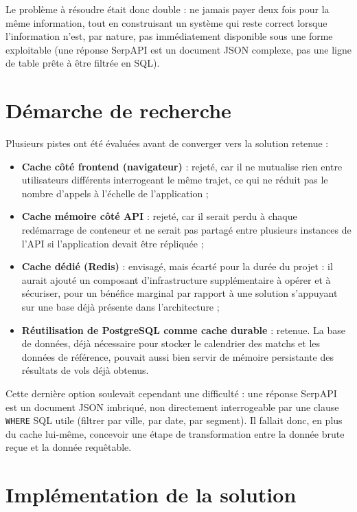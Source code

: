 \documentclass[11pt,a4paper]{report}
\newcommand{\code}[1]{\lstinline{#1}}
\begin{document}
Le problème à résoudre était donc double : ne jamais payer deux fois pour la même information, tout en construisant un système qui reste correct lorsque l'information n'est, par nature, pas immédiatement disponible sous une forme exploitable (une réponse SerpAPI est un document JSON complexe, pas une ligne de table prête à être filtrée en SQL).

\section{Démarche de recherche}

Plusieurs pistes ont été évaluées avant de converger vers la solution retenue :

\begin{itemize}
  \item \textbf{Cache côté frontend (navigateur)} : rejeté, car il ne mutualise rien entre utilisateurs différents interrogeant le même trajet, ce qui ne réduit pas le nombre d'appels à l'échelle de l'application ;
  \item \textbf{Cache mémoire côté API} : rejeté, car il serait perdu à chaque redémarrage de conteneur et ne serait pas partagé entre plusieurs instances de l'API si l'application devait être répliquée ;
  \item \textbf{Cache dédié (Redis)} : envisagé, mais écarté pour la durée du projet : il aurait ajouté un composant d'infrastructure supplémentaire à opérer et à sécuriser, pour un bénéfice marginal par rapport à une solution s'appuyant sur une base déjà présente dans l'architecture ;
  \item \textbf{Réutilisation de PostgreSQL comme cache durable} : retenue. La base de données, déjà nécessaire pour stocker le calendrier des matchs et les données de référence, pouvait aussi bien servir de mémoire persistante des résultats de vols déjà obtenus.
\end{itemize}

Cette dernière option soulevait cependant une difficulté : une réponse SerpAPI est un document JSON imbriqué, non directement interrogeable par une clause \code{WHERE} SQL utile (filtrer par ville, par date, par segment). Il fallait donc, en plus du cache lui-même, concevoir une étape de transformation entre la donnée brute reçue et la donnée requêtable.

\section{Implémentation de la solution}
\end{document}
